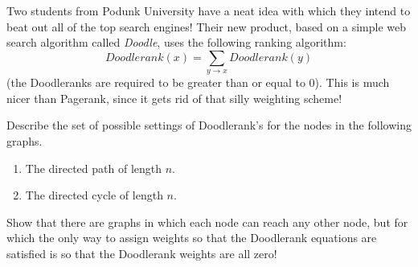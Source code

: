 \documentclass[twoside,12pt]{article}
\begin{document}
\begin{problem}[25 points]
Two students from Podunk University have a neat idea with which they
intend to beat out all of the top search engines! Their new product,
based on a simple web search algorithm called {\em Doodle},  uses
the following ranking algorithm:
$$Doodlerank(x) = \sum_{y \rightarrow x} Doodlerank(y)$$
(the Doodleranks are required to be greater than or equal to 0).
This is much nicer than Pagerank, since it gets rid of that silly
weighting scheme!

\bparts

\ppart Describe the set of possible settings of Doodlerank's for the
nodes in the following graphs.
\begin{enumerate}
\item The directed path of length $n$.


\item The directed cycle of length $n$.

\end{enumerate}

%

\ppart Show that there are graphs in which each node can reach any
other node, but for which the only way to assign weights so that the
Doodlerank equations are satisfied is so that the Doodlerank weights
are all zero!

\solution{An example of such a graph:

\begin{figure}[htp]
\begin{center}
\texttt{[image: pset5-x1tox3.jpg]}
\end{center}
\end{figure}



}
\end{problem}
\end{document}
